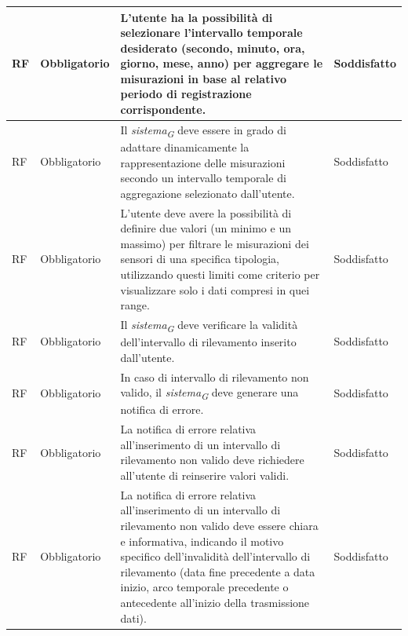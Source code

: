 \begin{longtable}{|C{1.5cm}|C{2cm}|L{5cm}|C{2cm}|}
    \hline
     RF & Obbligatorio & L'utente ha la possibilità di selezionare l'intervallo temporale desiderato (secondo, minuto, ora, giorno, mese, anno) per aggregare le misurazioni in base al relativo periodo di registrazione corrispondente.& Soddisfatto \\
    
    \hline
     RF & Obbligatorio & Il \textit{sistema}\textsubscript{\textit{G}} deve essere in grado di adattare dinamicamente la rappresentazione delle misurazioni secondo un intervallo temporale di aggregazione selezionato dall'utente.& Soddisfatto \\
    
    \hline
     RF & Obbligatorio &  L'utente deve avere la possibilità di definire due valori (un minimo e un massimo) per filtrare le misurazioni dei sensori di una specifica tipologia, utilizzando questi limiti come criterio per visualizzare solo i dati compresi in quei range.& Soddisfatto \\
    
    \hline
     RF & Obbligatorio & Il \textit{sistema}\textsubscript{\textit{G}} deve verificare la validità dell'intervallo di rilevamento inserito dall'utente.& Soddisfatto \\
    
    \hline
     RF & Obbligatorio & In caso di intervallo di rilevamento non valido, il \textit{sistema}\textsubscript{\textit{G}} deve generare una notifica di errore.& Soddisfatto \\
    
    \hline
     RF & Obbligatorio & La notifica di errore relativa all'inserimento di un intervallo di rilevamento non valido deve richiedere all'utente di reinserire valori validi.& Soddisfatto \\
    
    \hline
     RF & Obbligatorio & La notifica di errore relativa all'inserimento di un intervallo di rilevamento non valido deve essere chiara e informativa, indicando il motivo specifico dell'invalidità dell'intervallo di rilevamento (data fine precedente a data inizio, arco temporale precedente o antecedente all'inizio della trasmissione dati).& Soddisfatto \\
    

\end{longtable}
